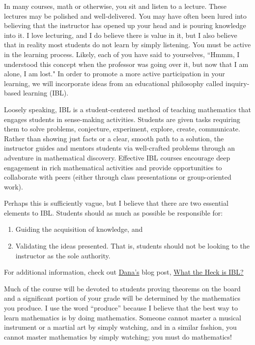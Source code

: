 In many courses, math or otherwise, you sit and listen to a lecture. These lectures may be polished and well-delivered. You may have often been lured into believing that the instructor has opened up your head and is pouring knowledge into it. I  love lecturing, and I do believe there is value in it, but I also believe that in reality most students do not learn by simply listening. You must be active in the learning process. Likely, each of you have said to yourselves, ``Hmmm, I understood this concept when the professor was going over it, but now that I am alone, I am lost." In order to promote a more active participation in your learning, we will incorporate ideas from an educational philosophy called inquiry-based learning (IBL).

Loosely speaking, IBL is a student-centered method of teaching mathematics that engages students in sense-making activities.  Students are given tasks requiring them to solve problems, conjecture, experiment, explore, create, communicate.  Rather than showing just facts or a clear, smooth path to a solution, the instructor guides and mentors students via well-crafted problems through an adventure in mathematical discovery.  Effective IBL courses encourage deep engagement in rich mathematical activities and provide opportunities to collaborate with peers (either through class presentations or group-oriented work).

Perhaps this is sufficiently vague, but I believe that there are two essential elements to IBL.  Students should as much as possible be responsible for:
\begin{enumerate}
\item Guiding the acquisition of knowledge, and
\item Validating the ideas presented.  That is, students should not be looking to the instructor as the sole authority.
\end{enumerate}
\noindent For additional information, check out \href{https://danaernst.com}{Dana's} blog post, \href{http://maamathedmatters.blogspot.com/2013/05/what-heck-is-ibl.html}{What the Heck is IBL?}

Much of the course will be devoted to students proving theorems on the board and a significant portion of your grade will be determined by the  mathematics you produce. I use the word ``produce'' because I believe that the best way to learn mathematics is by doing mathematics. Someone cannot master a musical instrument or a martial art by simply watching, and in a similar fashion, you cannot master mathematics by simply watching; you must do mathematics!

